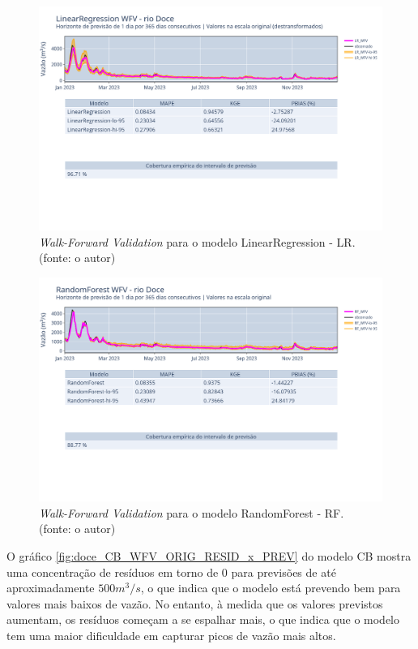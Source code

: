 \begin{figure}[!h]
\centering
\includegraphics[scale=0.33]{Figuras/rio_doce/wfv/LR/LR_WFV_LOG.png}
\caption{\textit{Walk-Forward Validation} para o modelo LinearRegression - LR.\\(fonte: o autor)}
\label{fig:doce_LR_WFV_LOG}
\end{figure}

\begin{figure}[!h]
\centering
\includegraphics[scale=0.33]{Figuras/rio_doce/wfv/RF/RF_WFV_ORIG.png}
\caption{\textit{Walk-Forward Validation} para o modelo RandomForest - RF.\\(fonte: o autor)}
\label{fig:doce_RF_WFV_ORIG}
\end{figure}
\clearpage

O gráfico \ref{fig:doce_CB_WFV_ORIG_RESID_x_PREV} do modelo CB mostra uma concentração de resíduos em torno de $0$ para previsões de até aproximadamente $500 m^3/s$, o que indica que o modelo está prevendo bem para valores mais baixos de vazão. No entanto, à medida que os valores previstos aumentam, os resíduos começam a se espalhar mais, o que indica que o modelo tem uma maior dificuldade em capturar picos de vazão mais altos.

